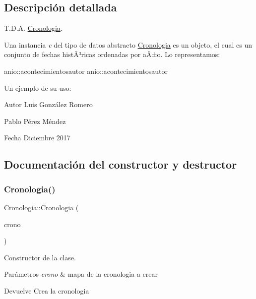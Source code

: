 \subsection{Descripción detallada}
T.\+D.\+A. \hyperlink{classCronologia}{Cronologia}. 

Una instancia {\itshape c} del tipo de datos abstracto {\ttfamily \hyperlink{classCronologia}{Cronologia}} es un objeto, el cual es un conjunto de fechas histÃ³ricas ordenadas por aÃ±o. Lo representamos\+:

anio\+::acontecimientosautor anio\+::acontecimientosautor

Un ejemplo de su uso\+: 
\begin{DoxyCodeInclude}
\end{DoxyCodeInclude}


\begin{DoxyAuthor}{Autor}
Luis González Romero 

Pablo Pérez Méndez 
\end{DoxyAuthor}
\begin{DoxyDate}{Fecha}
Diciembre 2017 
\end{DoxyDate}


\subsection{Documentación del constructor y destructor}
\mbox{\label{classCronologia_ab338ac4b9270cfc162c7220ee99578c9}} 
\subsubsection{\texorpdfstring{Cronologia()}{Cronologia()}\hspace{0.1cm}{\footnotesize\ttfamily [1/2]}}
{\footnotesize\ttfamily Cronologia\+::\+Cronologia (\begin{DoxyParamCaption}\item[{Mapa\+FH}]{crono }\end{DoxyParamCaption})}



Constructor de la clase. 


\begin{DoxyParams}{Parámetros}
{\em crono} & mapa de la cronologia a crear \\
\hline
\end{DoxyParams}
\begin{DoxyReturn}{Devuelve}
Crea la cronologia 
\end{DoxyReturn}
\mbox{\label{classCronologia_a0d102db0ec0c1d8a9ecb31cca7978ffe}} 
